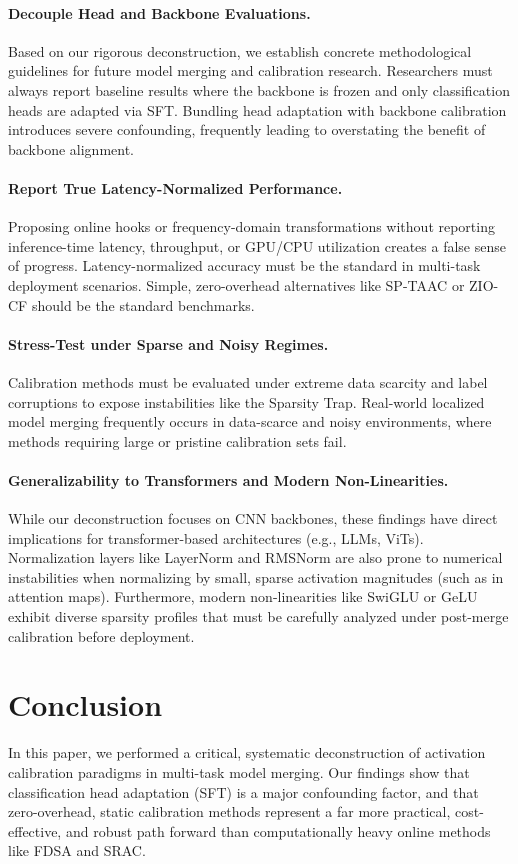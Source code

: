 \documentclass{article}
\theoremstyle{plain}
\theoremstyle{definition}
\theoremstyle{remark}
\begin{document}
\paragraph{Decouple Head and Backbone Evaluations.}
Based on our rigorous deconstruction, we establish concrete methodological guidelines for future model merging and calibration research. Researchers must always report baseline results where the backbone is frozen and only classification heads are adapted via SFT. Bundling head adaptation with backbone calibration introduces severe confounding, frequently leading to overstating the benefit of backbone alignment.

\paragraph{Report True Latency-Normalized Performance.}
Proposing online hooks or frequency-domain transformations without reporting inference-time latency, throughput, or GPU/CPU utilization creates a false sense of progress. Latency-normalized accuracy must be the standard in multi-task deployment scenarios. Simple, zero-overhead alternatives like SP-TAAC or ZIO-CF should be the standard benchmarks.

\paragraph{Stress-Test under Sparse and Noisy Regimes.}
Calibration methods must be evaluated under extreme data scarcity and label corruptions to expose instabilities like the Sparsity Trap. Real-world localized model merging frequently occurs in data-scarce and noisy environments, where methods requiring large or pristine calibration sets fail.

\paragraph{Generalizability to Transformers and Modern Non-Linearities.}
While our deconstruction focuses on CNN backbones, these findings have direct implications for transformer-based architectures (e.g., LLMs, ViTs). Normalization layers like LayerNorm and RMSNorm are also prone to numerical instabilities when normalizing by small, sparse activation magnitudes (such as in attention maps). Furthermore, modern non-linearities like SwiGLU or GeLU exhibit diverse sparsity profiles that must be carefully analyzed under post-merge calibration before deployment.

\section{Conclusion}
\label{sec:conclusion}
In this paper, we performed a critical, systematic deconstruction of activation calibration paradigms in multi-task model merging. Our findings show that classification head adaptation (SFT) is a major confounding factor, and that zero-overhead, static calibration methods represent a far more practical, cost-effective, and robust path forward than computationally heavy online methods like FDSA and SRAC.
\end{document}
